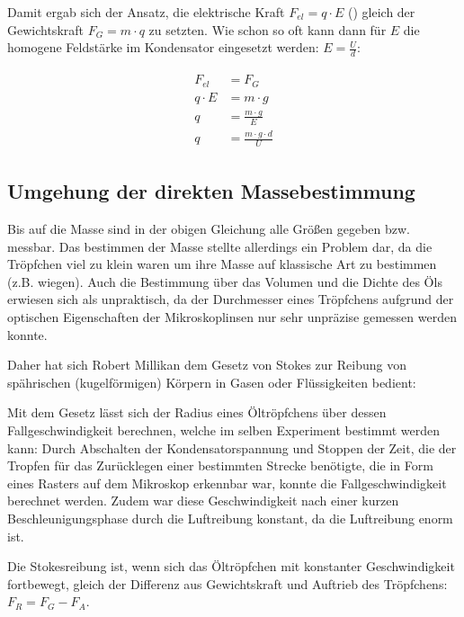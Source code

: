 Damit ergab sich der Ansatz, die elektrische Kraft $F_{el}=q \cdot E$ () gleich der Gewichtskraft $F_G = m \cdot q$ zu setzten. Wie schon so oft kann dann für $E$ die homogene Feldstärke im Kondensator eingesetzt werden: $E = \frac{U}{d}$:

\begin{align} \label{eq:MillikanAnsatz}
\begin{split}
	F_{el} &= F_G \\
	q \cdot E &= m \cdot g \\
	q &= \frac{m \cdot g}{E} \\
	q &= \frac{m \cdot g \cdot d}{U}
\end{split}
\end{align}


\subsection{Umgehung der direkten Massebestimmung}

Bis auf die Masse sind in der obigen Gleichung alle Größen gegeben bzw. messbar. Das bestimmen der Masse stellte allerdings ein Problem dar, da die Tröpfchen viel zu klein waren um ihre Masse auf klassische Art zu bestimmen (z.B. wiegen). Auch die Bestimmung über das Volumen und die Dichte des Öls erwiesen sich als unpraktisch, da der Durchmesser eines Tröpfchens aufgrund der optischen Eigenschaften der Mikroskoplinsen nur sehr unpräzise gemessen werden konnte.

Daher hat sich Robert Millikan dem Gesetz von Stokes zur Reibung von spährischen (\glqq kugelförmigen\grqq) Körpern in Gasen oder Flüssigkeiten bedient: 

Mit dem Gesetz lässt sich der Radius eines Öltröpfchens über dessen Fallgeschwindigkeit berechnen, welche im selben Experiment bestimmt werden kann: Durch Abschalten der Kondensatorspannung und Stoppen der Zeit, die der Tropfen für das Zurücklegen einer bestimmten Strecke benötigte, die in Form eines Rasters auf dem Mikroskop erkennbar war, konnte die Fallgeschwindigkeit berechnet werden. Zudem war diese Geschwindigkeit nach einer kurzen Beschleunigungsphase durch die Luftreibung konstant, da die Luftreibung enorm ist.

Die Stokesreibung ist, wenn sich das Öltröpfchen mit konstanter Geschwindigkeit fortbewegt, gleich der Differenz aus Gewichtskraft und Auftrieb des Tröpfchens: $F_R = F_G - F_A$.

